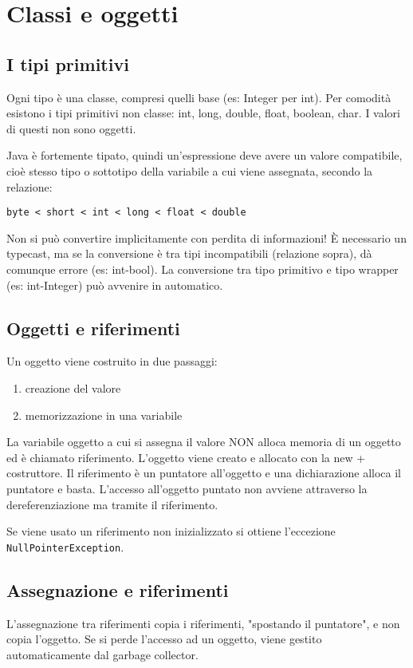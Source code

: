 \chapter{Classi e oggetti}

\section{I tipi primitivi}
Ogni tipo è una classe, compresi quelli base (es: Integer per int). 
Per comodità esistono i tipi primitivi non classe: int, long, double, float, boolean, char. I valori di questi non sono oggetti.

Java è fortemente tipato, quindi un'espressione deve avere un valore compatibile, cioè stesso tipo o sottotipo della variabile a cui viene assegnata, secondo la relazione:
\begin{verbatim}
byte < short < int < long < float < double 
\end{verbatim} 
Non si può convertire implicitamente con perdita di informazioni! È necessario un typecast, ma se la conversione è tra tipi incompatibili (relazione sopra), dà comunque errore (es: int-bool). La conversione tra tipo primitivo e tipo wrapper (es: int-Integer) può avvenire in automatico.

\section{Oggetti e riferimenti}
Un oggetto viene costruito in due passaggi:
\begin{enumerate}
\item creazione del valore
\item memorizzazione in una variabile
\end{enumerate}
La variabile oggetto a cui si assegna il valore NON alloca memoria di un oggetto ed è chiamato riferimento.
L'oggetto viene creato e allocato con la new + costruttore.
Il riferimento è un puntatore all'oggetto e una dichiarazione alloca il puntatore e basta. L'accesso all'oggetto puntato non avviene attraverso la dereferenziazione ma tramite il riferimento.

Se viene usato un riferimento non inizializzato si ottiene l'eccezione \texttt{NullPointerException}.

\section{Assegnazione e riferimenti}
L'assegnazione tra riferimenti copia i riferimenti, "spostando il puntatore", e non copia l'oggetto. Se si perde l'accesso ad un oggetto, viene gestito automaticamente dal garbage collector.

